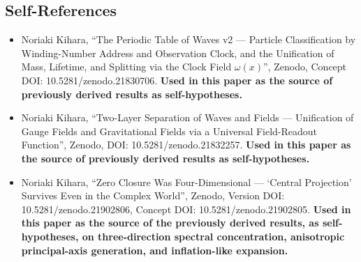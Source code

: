 \documentclass[
  a4paper,
]{article}
\providecommand{\tightlist}{%
  \setlength{\itemsep}{0pt}\setlength{\parskip}{0pt}}
\begin{document}
\subsection{Self-References}\label{self-references}

\begin{itemize}
\tightlist
\item
  Noriaki Kihara, ``The Periodic Table of Waves v2 --- Particle
  Classification by Winding-Number Address and Observation Clock, and
  the Unification of Mass, Lifetime, and Splitting via the Clock Field
  \(\omega(x)\)'', Zenodo, Concept DOI: 10.5281/zenodo.21830706.
  \textbf{Used in this paper as the source of previously derived results
  as self-hypotheses.}
\item
  Noriaki Kihara, ``Two-Layer Separation of Waves and Fields ---
  Unification of Gauge Fields and Gravitational Fields via a Universal
  Field-Readout Function'', Zenodo, DOI: 10.5281/zenodo.21832257.
  \textbf{Used in this paper as the source of previously derived results
  as self-hypotheses.}
\item
  Noriaki Kihara, ``Zero Closure Was Four-Dimensional --- `Central
  Projection' Survives Even in the Complex World'', Zenodo, Version DOI:
  10.5281/zenodo.21902806, Concept DOI: 10.5281/zenodo.21902805.
  \textbf{Used in this paper as the source of the previously derived
  results, as self-hypotheses, on three-direction spectral
  concentration, anisotropic principal-axis generation, and
  inflation-like expansion.}
\end{itemize}
\end{document}
